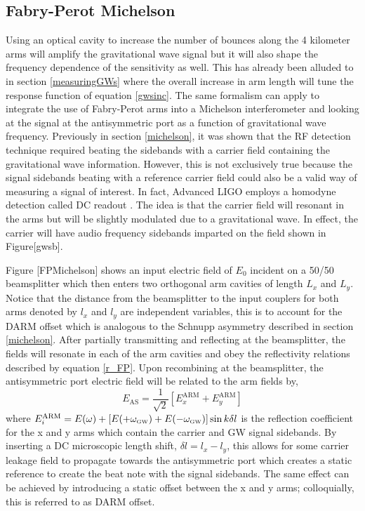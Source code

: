 		
		\subsection{Fabry-Perot Michelson}
		Using an optical cavity to increase the number of bounces along the 4 kilometer arms will amplify the gravitational wave signal but it will also shape the frequency dependence of the sensitivity as well.  This has already been alluded to in section \ref{measuringGWs} where the overall increase in arm length will tune the response function of equation \ref{gwsinc}.  The same formalism can apply to integrate the use of Fabry-Perot arms into a Michelson interferometer and looking at the signal at the antisymmetric port as a function of gravitational wave frequency. Previously in section \ref{michelson}, it was shown that the RF detection technique required beating the sidebands with a carrier field containing the gravitational wave information.  However, this is not exclusively true because the signal sidebands beating with a reference carrier field could also be a valid way of measuring a signal of interest. In fact, Advanced LIGO employs a homodyne detection called DC readout \cite{FritschelReadout}. The idea is that the carrier field will resonant in the arms but will be slightly modulated due to a gravitational wave.  In effect, the carrier will have audio frequency sidebands imparted on the field shown in Figure[gwsb].  
		
		Figure [FPMichelson] shows an input electric field of $E_0$ incident on a 50/50 beamsplitter which then enters two orthogonal arm cavities of length $L_x$ and $L_y$.  Notice that the distance from the beamsplitter to the input couplers for both arms denoted by $l_x$ and $l_y$ are independent variables, this is to account for the DARM offset which is analogous to the Schnupp asymmetry described in section \ref{michelson}.  After partially transmitting and reflecting at the beamsplitter, the fields will resonate in each of the arm cavities and obey the reflectivity relations described by equation \ref{r_FP}.  Upon recombining at the beamsplitter, the antisymmetric port electric field will be related to the arm fields by,
		\begin{equation}
		E_{\text{AS}} = \frac{1}{\sqrt{2}} [E_{x}^{\text{ARM}} + E_{y}^{\text{ARM}} ] 
		\end{equation}
		where $E_{i}^{\text{ARM}} = E(\omega) + [E(+ \omega_{\text{\tiny GW}}) + E(- \omega_{\text{\tiny GW}})] \sin{k\delta l } $ is the reflection coefficient for the x and y arms which contain the carrier and GW signal sidebands.  By inserting a DC microscopic length shift, $\delta l = l_x - l_y$, this allows for some carrier leakage field to propagate towards the antisymmetric port which creates a static reference to create the beat note with the signal sidebands.  The same effect can be achieved by introducing a static offset between the x and y arms; colloquially, this is referred to as DARM offset.
		
